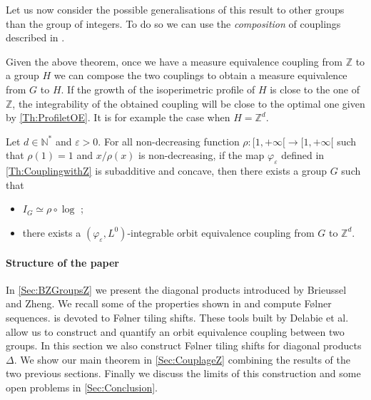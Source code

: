 \documentclass[english, 11pt, a4paper]{article}
\theoremstyle{definition}
\numberwithin{equation}{section}
\newcommand{\bN}{\mathbb{N}}
\newcommand{\bZ}{\mathbb{Z}}
\newcommand{\BZ}{\Delta}
\begin{document}
\bigskip

Let us now consider the possible generalisations of this result to other
groups than the group of integers. 
To do so we can use the \emph{composition} of couplings described in
\cite[Section~2]{DKLMT}.

Given the above theorem, once we have a measure equivalence coupling from $\bZ$
to a group $H$ we can compose the two couplings to obtain a measure equivalence
from $G$ to $H$.
If the growth of the isoperimetric profile of $H$ is close to the one of $\bZ$, the
integrability of the obtained coupling will be close to the optimal one given by
\cref{Th:ProfiletOE}. It is for example the case when $H=\bZ^d$.

\begin{Cor}\label{Rq:Zd} Let $d\in \bN^{*}$ and $\varepsilon>0$.
  For all non-decreasing function $\rho: [1,+\infty[
  \rightarrow [1,+\infty[$ such that $\rho(1)=1$ and $x/\rho(x)$ is
  non-decreasing,
  if the map $\varphi_\varepsilon$ defined in \cref{Th:CouplingwithZ}
  is subadditive and concave, then there exists a group $G$ such that
  \begin{itemize}
  \item $I_{G}\simeq \rho \circ \log$ ;
  \item there exists a $(\varphi_{\varepsilon},L^0)$-integrable orbit
  equivalence coupling from $G$ to $\bZ^d$.
  \end{itemize}
\end{Cor}

\paragraph{Structure of the paper} In \cref{Sec:BZGroupsZ} we present the
diagonal products introduced by Brieussel and Zheng. We recall some of the
properties shown in \cite{BZ} and compute Følner sequences.
 is devoted to Følner tiling shifts. These tools built by Delabie
et al. \cite{DKLMT} allow us to construct and quantify an orbit equivalence coupling
between two groups. In this section we also construct Følner tiling shifts for
diagonal products $\BZ$.
We show our main theorem in \cref{Sec:CouplageZ} combining the results of the
two previous sections. Finally we discuss the limits of this construction and
some open problems in \cref{Sec:Conclusion}.

\begin{center}
\end{center}
\end{document}
